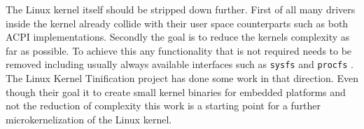 \documentclass[
a4paper,
12pt,
notitlepage,
parskip=half,
DIV=11,
]{scrbook}
\begin{document}
		The Linux kernel itself should be stripped down further.
		First of all many drivers inside the kernel already collide with their user space counterparts such as both ACPI implementations.
		Secondly the goal is to reduce the kernels complexity as far as possible.
		To achieve this any functionality that is not required needs to be removed including usually always available interfaces such as \texttt{sysfs} \citep{sysfs} and \texttt{procfs} \citep{procfs}.
		The Linux Kernel Tinification project \citep{tiny} has done some work in that direction.
		Even though their goal it to create small kernel binaries for embedded platforms and not the reduction of complexity this work is a starting point for a further microkernelization of the Linux kernel.
	
	
	
	
\end{document}
